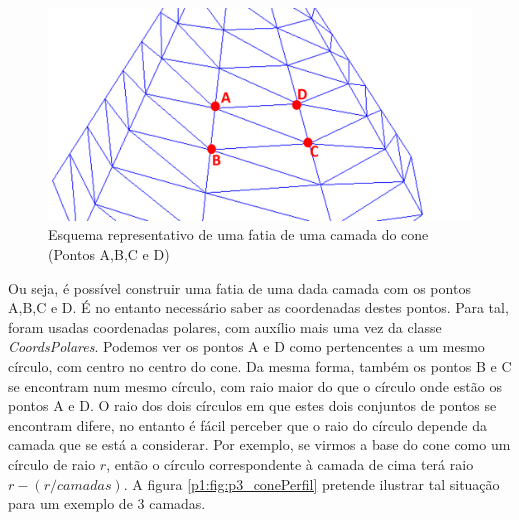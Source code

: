 \begin{figure}[<+htpb+>]
	\centering
	\includegraphics[scale=0.5]{imagens/p3_seccaoCone_edit.png}
	\caption{Esquema representativo de uma fatia de uma camada do cone (Pontos A,B,C e D)}
	\label{p1:fig:p3_seccaoCone_edit}
\end{figure}

Ou seja, é possível construir uma fatia de uma dada camada com os pontos A,B,C e D. É no entanto necessário saber as coordenadas destes pontos. Para tal, foram usadas coordenadas polares, com auxílio mais uma vez da classe \textit{CoordsPolares}. Podemos ver os pontos A e D como pertencentes a um mesmo círculo, com centro no centro do cone. Da mesma forma, também os pontos B e C se encontram num mesmo círculo, com raio maior do que o círculo onde estão os pontos A e D. O raio dos dois círculos em que estes dois conjuntos de pontos se encontram difere, no entanto é fácil perceber que o raio do círculo depende da camada que se está a considerar. Por exemplo, se virmos a base do cone como um círculo de raio $r$, então o círculo correspondente à camada de cima terá raio $r - (r/camadas)$. A figura \ref{p1:fig:p3_conePerfil} pretende ilustrar tal situação para um exemplo de 3 camadas.

